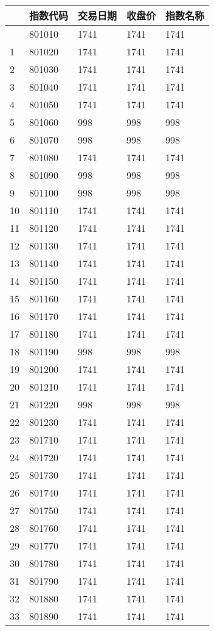 \documentclass[
  letterpaper,
  DIV=11,
  numbers=noendperiod]{scrreprt}
\begin{document}
\begin{longtable}[]{@{}lllll@{}}
\toprule\noalign{}
& 指数代码 & 交易日期 & 收盘价 & 指数名称 \\
\midrule\noalign{}
\endhead
\bottomrule\noalign{}
\endlastfoot
0 & 801010 & 1741 & 1741 & 1741 \\
1 & 801020 & 1741 & 1741 & 1741 \\
2 & 801030 & 1741 & 1741 & 1741 \\
3 & 801040 & 1741 & 1741 & 1741 \\
4 & 801050 & 1741 & 1741 & 1741 \\
5 & 801060 & 998 & 998 & 998 \\
6 & 801070 & 998 & 998 & 998 \\
7 & 801080 & 1741 & 1741 & 1741 \\
8 & 801090 & 998 & 998 & 998 \\
9 & 801100 & 998 & 998 & 998 \\
10 & 801110 & 1741 & 1741 & 1741 \\
11 & 801120 & 1741 & 1741 & 1741 \\
12 & 801130 & 1741 & 1741 & 1741 \\
13 & 801140 & 1741 & 1741 & 1741 \\
14 & 801150 & 1741 & 1741 & 1741 \\
15 & 801160 & 1741 & 1741 & 1741 \\
16 & 801170 & 1741 & 1741 & 1741 \\
17 & 801180 & 1741 & 1741 & 1741 \\
18 & 801190 & 998 & 998 & 998 \\
19 & 801200 & 1741 & 1741 & 1741 \\
20 & 801210 & 1741 & 1741 & 1741 \\
21 & 801220 & 998 & 998 & 998 \\
22 & 801230 & 1741 & 1741 & 1741 \\
23 & 801710 & 1741 & 1741 & 1741 \\
24 & 801720 & 1741 & 1741 & 1741 \\
25 & 801730 & 1741 & 1741 & 1741 \\
26 & 801740 & 1741 & 1741 & 1741 \\
27 & 801750 & 1741 & 1741 & 1741 \\
28 & 801760 & 1741 & 1741 & 1741 \\
29 & 801770 & 1741 & 1741 & 1741 \\
30 & 801780 & 1741 & 1741 & 1741 \\
31 & 801790 & 1741 & 1741 & 1741 \\
32 & 801880 & 1741 & 1741 & 1741 \\
33 & 801890 & 1741 & 1741 & 1741 \\
\end{longtable}
\end{document}

